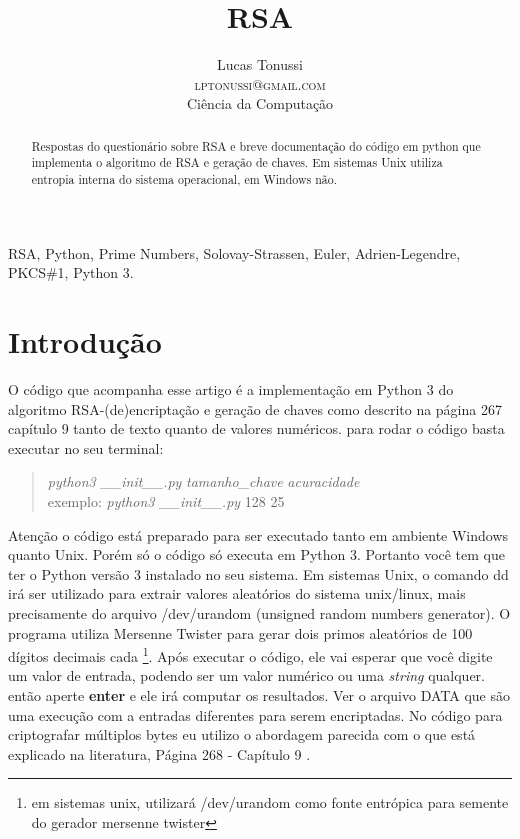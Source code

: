 \documentclass[conference]{IEEEtran}
\title{\LARGE RSA}
\author {
  Lucas Tonussi\\
  \textsc{lptonussi@gmail.com}\\
  \small{Ciência da Computação}
}
\begin{document}
\maketitle

\begin{abstract}
Respostas do questionário sobre RSA e breve documentação do código em python que
implementa o algoritmo de RSA e geração de chaves. Em sistemas Unix utiliza
entropia interna do sistema operacional, em Windows não.
\end{abstract}

\IEEEoverridecommandlockouts

\begin{keywords}
RSA, Python, Prime Numbers, Solovay-Strassen, Euler, Adrien-Legendre, PKCS\#1,
Python 3.
\end{keywords}

\IEEEpeerreviewmaketitle

\section{Introdução}

O código que acompanha esse artigo é a implementação em Python 3 do algoritmo
RSA-(de)encriptação e geração de chaves como descrito na página 267 capítulo 9
\cite{stallings} tanto de texto quanto de valores numéricos. para rodar o código
basta executar no seu terminal:

\hfil

\begin{quotation}
  \small \textit{python3} \textit{\_\_init\_\_.py} \textit{tamanho\_chave}
  \textit{acuracidade} \\

  exemplo: \textit{python3} \textit{\_\_init\_\_.py} 128 25
\end{quotation}

\hfil

Atenção o código está preparado para ser executado tanto em ambiente Windows
quanto Unix. Porém só o código só executa em Python 3. Portanto você tem que ter
o Python versão 3 instalado no seu sistema. Em sistemas Unix, o comando dd irá
ser utilizado para extrair valores aleatórios do sistema unix/linux, mais
precisamente do arquivo /dev/urandom (unsigned random numbers generator). O
programa utiliza Mersenne Twister para gerar dois primos aleatórios de 100
dígitos decimais cada \footnote{em sistemas unix, utilizará /dev/urandom como
  fonte entrópica para semente do gerador mersenne twister}. Após executar o
código, ele vai esperar que você digite um valor de entrada, podendo ser um
valor numérico ou uma \textit{string} qualquer. então aperte \textbf{enter} e
ele irá computar os resultados. Ver o arquivo DATA que são uma execução com a
entradas diferentes para serem encriptadas. No código para criptografar
múltiplos bytes eu utilizo o abordagem parecida com o que está explicado na
literatura, Página 268 - Capítulo 9 \cite{stallings}.
\end{document}
